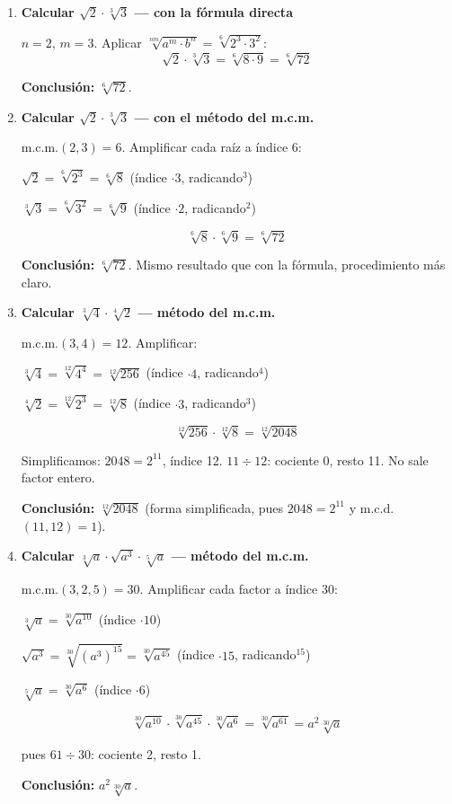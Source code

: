 \documentclass[11pt, letterpaper]{article}
\begin{document}
\begin{tcolorbox}[examplebox, title={Ejemplos — multiplicación con distinto índice}]
\begin{enumerate}[label=\textbf{Ej. \arabic*.}, leftmargin=*, itemsep=14pt]

\item \textbf{Calcular $\sqrt{2}\cdot\sqrt[3]{3}$ — con la fórmula directa}

$n=2$, $m=3$. Aplicar $\sqrt[nm]{a^m\cdot b^n}=\sqrt[6]{2^3\cdot 3^2}$:
$$\sqrt{2}\cdot\sqrt[3]{3}=\sqrt[6]{8\cdot 9}=\sqrt[6]{72}$$

\textbf{Conclusión:} $\sqrt[6]{72}$.

\item \textbf{Calcular $\sqrt{2}\cdot\sqrt[3]{3}$ — con el método del m.c.m.}

m.c.m.$(2,3)=6$. Amplificar cada raíz a índice 6:

$\sqrt{2}=\sqrt[6]{2^3}=\sqrt[6]{8}$ \quad (índice $\cdot 3$, radicando$^3$)

$\sqrt[3]{3}=\sqrt[6]{3^2}=\sqrt[6]{9}$ \quad (índice $\cdot 2$, radicando$^2$)

$$\sqrt[6]{8}\cdot\sqrt[6]{9}=\sqrt[6]{72}$$

\textbf{Conclusión:} $\sqrt[6]{72}$. Mismo resultado que con la fórmula, procedimiento más claro.

\item \textbf{Calcular $\sqrt[3]{4}\cdot\sqrt[4]{2}$ — método del m.c.m.}

m.c.m.$(3,4)=12$. Amplificar:

$\sqrt[3]{4}=\sqrt[12]{4^4}=\sqrt[12]{256}$ \quad (índice $\cdot 4$, radicando$^4$)

$\sqrt[4]{2}=\sqrt[12]{2^3}=\sqrt[12]{8}$ \quad (índice $\cdot 3$, radicando$^3$)

$$\sqrt[12]{256}\cdot\sqrt[12]{8}=\sqrt[12]{2048}$$

Simplificamos: $2048=2^{11}$, índice 12. $11\div 12$: cociente 0, resto 11. No sale factor entero.

\textbf{Conclusión:} $\sqrt[12]{2048}$ (forma simplificada, pues $2048=2^{11}$ y m.c.d.$(11,12)=1$).

\item \textbf{Calcular $\sqrt[3]{a}\cdot\sqrt{a^3}\cdot\sqrt[5]{a}$ — método del m.c.m.}

m.c.m.$(3,2,5)=30$. Amplificar cada factor a índice 30:

$\sqrt[3]{a}=\sqrt[30]{a^{10}}$ \quad (índice $\cdot 10$)

$\sqrt{a^3}=\sqrt[30]{(a^3)^{15}}=\sqrt[30]{a^{45}}$ \quad (índice $\cdot 15$, radicando$^{15}$)

$\sqrt[5]{a}=\sqrt[30]{a^{6}}$ \quad (índice $\cdot 6$)

$$\sqrt[30]{a^{10}}\cdot\sqrt[30]{a^{45}}\cdot\sqrt[30]{a^{6}}=\sqrt[30]{a^{61}}=a^2\sqrt[30]{a}$$

pues $61\div 30$: cociente 2, resto 1.

\textbf{Conclusión:} $a^2\sqrt[30]{a}$.

\end{enumerate}
\end{tcolorbox}
\end{document}
